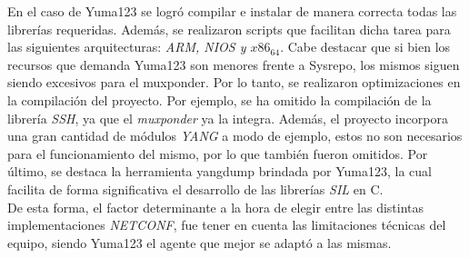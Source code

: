 	En el caso de Yuma123 se logró compilar e instalar de manera correcta todas las librerías requeridas. Además, se realizaron scripts que facilitan dicha tarea para las siguientes arquitecturas: \textit{ARM, NIOS y $x86_64$}. Cabe destacar que si bien los recursos que demanda Yuma123 son menores frente a Sysrepo, los mismos siguen siendo excesivos para el muxponder. Por lo tanto, se realizaron optimizaciones en la compilación del proyecto. Por ejemplo, se ha omitido la compilación de la librería \textit{SSH}, ya que el \textit{muxponder} ya la integra. Además, el proyecto incorpora una gran cantidad de módulos \textit{YANG} a modo de ejemplo, estos no son necesarios para el funcionamiento del mismo, por lo que también fueron omitidos. Por último, se destaca la herramienta yangdump brindada por Yuma123, la cual facilita de forma significativa el desarrollo de las librerías \textit{SIL} en C.
	\\

	De esta forma, el factor determinante a la hora de elegir entre las distintas implementaciones \textit{NETCONF}, fue tener en cuenta las limitaciones técnicas del equipo, siendo Yuma123 el agente que mejor se adaptó a las mismas. 

